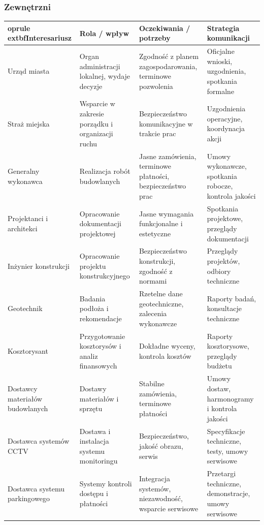 \documentclass[a4paper,12pt]{article}
\begin{document}
\subsubsection*{Zewnętrzni}
\begin{center}
\begin{tabularx}{\textwidth}{X X X X}
	oprule
	extbf{Interesariusz} & \textbf{Rola / wpływ} & \textbf{Oczekiwania / potrzeby} & \textbf{Strategia komunikacji} \\
\midrule
Urząd miasta & Organ administracji lokalnej, wydaje decyzje & Zgodność z planem zagospodarowania, terminowe pozwolenia & Oficjalne wnioski, uzgodnienia, spotkania formalne \\
\addlinespace
Straż miejska & Wsparcie w zakresie porządku i organizacji ruchu & Bezpieczeństwo komunikacyjne w trakcie prac & Uzgodnienia operacyjne, koordynacja akcji \\
\addlinespace
Generalny wykonawca & Realizacja robót budowlanych & Jasne zamówienia, terminowe płatności, bezpieczeństwo prac & Umowy wykonawcze, spotkania robocze, kontrola jakości \\
\addlinespace
Projektanci i architekci & Opracowanie dokumentacji projektowej & Jasne wymagania funkcjonalne i estetyczne & Spotkania projektowe, przeglądy dokumentacji \\
\addlinespace
Inżynier konstrukcji & Opracowanie projektu konstrukcyjnego & Bezpieczeństwo konstrukcji, zgodność z normami & Przeglądy projektów, odbiory techniczne \\
\addlinespace
Geotechnik & Badania podłoża i rekomendacje & Rzetelne dane geotechniczne, zalecenia wykonawcze & Raporty badań, konsultacje techniczne \\
\addlinespace
Kosztorysant & Przygotowanie kosztorysów i analiz finansowych & Dokładne wyceny, kontrola kosztów & Raporty kosztorysowe, przeglądy budżetu \\
\addlinespace
Dostawcy materiałów budowlanych & Dostawy materiałów i sprzętu & Stabilne zamówienia, terminowe płatności & Umowy dostaw, harmonogramy i kontrola jakości \\
\addlinespace
Dostawca systemów CCTV & Dostawa i instalacja systemu monitoringu & Bezpieczeństwo, jakość obrazu, serwis & Specyfikacje techniczne, testy, umowy serwisowe \\
\addlinespace
Dostawca systemu parkingowego & Systemy kontroli dostępu i płatności & Integracja systemów, niezawodność, wsparcie serwisowe & Przetargi techniczne, demonstracje, umowy serwisowe \\

\end{tabularx}
\end{center}
\end{document}
